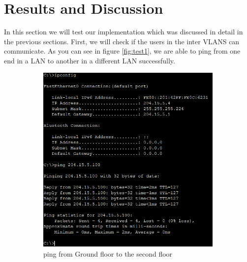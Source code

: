 \documentclass[ a4, 12pt, onecolumn]{IEEEtran}
\begin{document}
\section{Results and Discussion}
In this section we will test our implementation which was discussed in detail in the previous sections. 
First, we will check if the users in the inter VLANS can communicate.
As you can see in figure \ref{fig:test1}, we are able to ping from one end in a LAN to another in a different LAN successfully.
\begin{figure}[H]
  \begin{subfigure}[b]{0.4\textwidth}
    \includegraphics[width=\textwidth]{comm.png}
    \caption{ping from Ground floor to the second floor}
  \end{subfigure}
  \hfill
  \begin{subfigure}[b]{0.4\textwidth}

\end{subfigure}
\end{figure}
\end{document}
